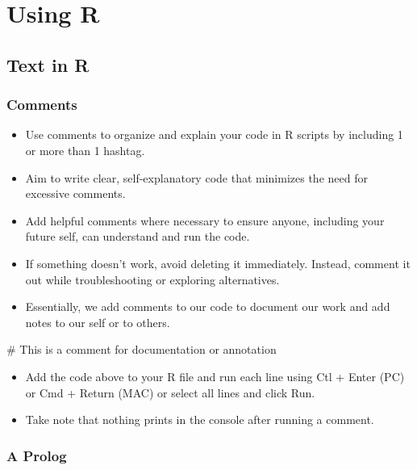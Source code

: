 \documentclass[
  letterpaper,
  DIV=11,
  numbers=noendperiod]{scrreprt}
\newenvironment{Shaded}{\begin{snugshade}}{\end{snugshade}}
\newcommand{\CommentTok}[1]{\textcolor[rgb]{0.37,0.37,0.37}{#1}}
\providecommand{\tightlist}{%
  \setlength{\itemsep}{0pt}\setlength{\parskip}{0pt}}\usepackage{longtable,booktabs,array}
\begin{document}

\chapter{Using R}\label{using-r}

\section{Text in R}\label{text-in-r}

\subsection{Comments}\label{comments}

\begin{itemize}
\item
  Use comments to organize and explain your code in R scripts by
  including 1 or more than 1 hashtag.
\item
  Aim to write clear, self-explanatory code that minimizes the need for
  excessive comments.
\item
  Add helpful comments where necessary to ensure anyone, including your
  future self, can understand and run the code.
\item
  If something doesn't work, avoid deleting it immediately. Instead,
  comment it out while troubleshooting or exploring alternatives.
\item
  Essentially, we add comments to our code to document our work and add
  notes to our self or to others.
\end{itemize}

\begin{Shaded}
\begin{Highlighting}[]
\CommentTok{\# This is a comment for documentation or annotation}
\end{Highlighting}
\end{Shaded}

\begin{itemize}
\tightlist
\item
  Add the code above to your R file and run each line using Ctl + Enter
  (PC) or Cmd + Return (MAC) or select all lines and click Run.
\item
  Take note that nothing prints in the console after running a comment.
\end{itemize}

\subsection{A Prolog}\label{a-prolog}
\end{document}
